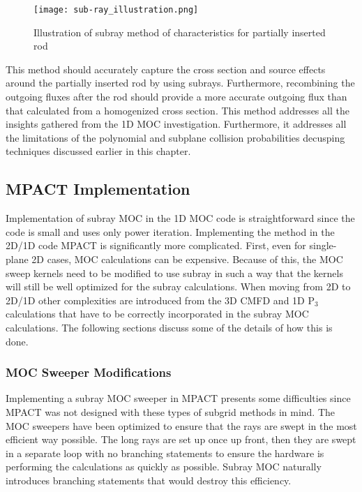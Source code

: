 \begin{figure}
    \centering
    \texttt{[image: sub-ray\_illustration.png]}
    \caption[Subray MOC Illustration]{Illustration of subray method of characteristics for partially inserted rod}\label{f:subrayMOC}
\end{figure}

This method should accurately capture the cross section and source effects around the partially inserted rod by using subrays.  Furthermore, recombining the outgoing fluxes after the rod should provide a more accurate outgoing flux than that calculated from a homogenized cross section.  This method addresses all the insights gathered from the 1D MOC investigation.  Furthermore, it addresses all the limitations of the polynomial and subplane collision probabilities decusping techniques discussed earlier in this chapter.

\subsection{MPACT Implementation}

Implementation of subray MOC in the 1D MOC code is straightforward since the code is small and uses only power iteration.  Implementing the method in the 2D/1D code MPACT is significantly more complicated.  First, even for single-plane 2D cases, MOC calculations can be expensive.  Because of this, the MOC sweep kernels need to be modified to use subray in such a way that the kernels will still be well optimized for the subray calculations.  When moving from 2D to 2D/1D other complexities are introduced from the 3D CMFD and 1D P$_3$ calculations that have to be correctly incorporated in the subray MOC calculations.  The following sections discuss some of the details of how this is done.

\subsubsection{MOC Sweeper Modifications}


Implementing a subray MOC sweeper in MPACT presents some difficulties since MPACT was not designed with these types of subgrid methods in mind.  The MOC sweepers have been optimized to ensure that the rays are swept in the most efficient way possible.  The long rays are set up once up front, then they are swept in a separate loop with no branching statements to ensure the hardware is performing the calculations as quickly as possible.  Subray MOC naturally introduces branching statements that would destroy this efficiency.

